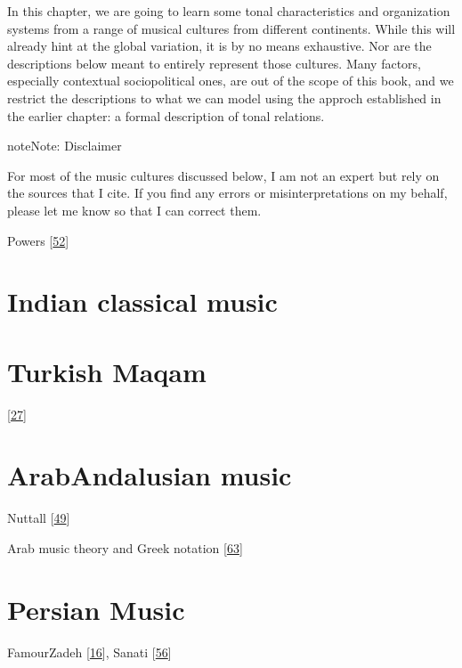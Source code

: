 \documentclass[letterpaper,10pt,english]{sphinxmanual}
\begin{document}
\sphinxAtStartPar
In this chapter, we are going to learn some tonal characteristics
and organization systems from a range of musical cultures from
different continents. While this will already hint at the global variation,
it is by no means exhaustive. Nor are the descriptions below meant to entirely
represent those cultures. Many factors, especially contextual sociopolitical
ones, are out of the scope of this book, and we restrict the descriptions to
what we can model using the approch established in the earlier chapter:
a formal description of tonal relations.

\begin{sphinxadmonition}{note}{Note:}
\sphinxAtStartPar
Disclaimer

\sphinxAtStartPar
For most of the music cultures discussed below,
I am not an expert but rely on the sources that I cite.
If you find any errors or misinterpretations on my behalf,
please let me know so that I can correct them.
\end{sphinxadmonition}

\sphinxAtStartPar
Powers  {[}\hyperlink{cite.8_bibliography:id23}{52}{]}


\section{Indian classical music}
\label{\detokenize{2_scales_modes:indian-classical-music}}

\section{Turkish Maqam}
\label{\detokenize{2_scales_modes:turkish-maqam}}
\sphinxAtStartPar
{} {[}\hyperlink{cite.8_bibliography:id60}{27}{]}


\section{Arab\sphinxhyphen{}Andalusian music}
\label{\detokenize{2_scales_modes:arab-andalusian-music}}
\sphinxAtStartPar
Nuttall  {[}\hyperlink{cite.8_bibliography:id79}{49}{]}

\sphinxAtStartPar
Arab music theory and Greek notation {[}\hyperlink{cite.8_bibliography:id34}{63}{]}


\section{Persian Music}
\label{\detokenize{2_scales_modes:persian-music}}
\sphinxAtStartPar
FamourZadeh {[}\hyperlink{cite.8_bibliography:id77}{16}{]}, Sanati {[}\hyperlink{cite.8_bibliography:id73}{56}{]}
\end{document}

